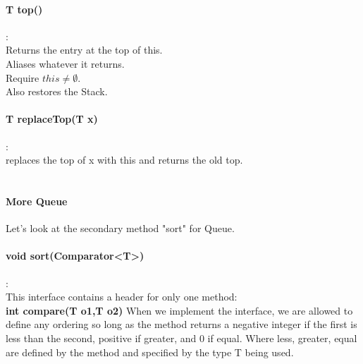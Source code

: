 \documentclass[10pt]{article}
\begin{document}
\paragraph{T top()}:\\
Returns the entry at the top of this. \\
Aliases whatever it returns.\\
Require $this \neq \emptyset$. \\
Also restores the Stack.\\
\paragraph{T replaceTop(T x)}:\\
replaces the top of x with this and returns the old top. \\\\
\paragraph{More Queue} Let's look at the secondary method "sort" for Queue. 
\paragraph{void sort(Comparator<T>)}:\\
This interface contains a header for only one method:\\
 \textbf{int compare(T o1,T o2)} When we implement the interface, we are allowed to define any ordering so long as the method returns a negative integer if the first is less than the second, positive if greater, and 0 if equal. Where less, greater, equal are defined by the method and specified by the type T being used. \\
 
\end{document}
